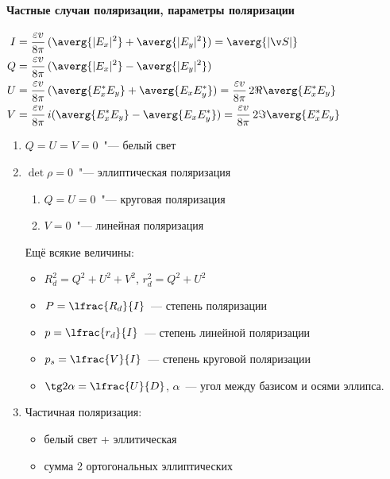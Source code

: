 \documentclass{trchesh}
\begin{document}
\begin{multicols*}{3}
\paragraph{Частные случаи поляризации, параметры поляризации}
$
\begin{aligned}
  I &= \frac{\varepsilon v}{8 \pi} \, (\averg{|E_x|^2} +  \averg{|E_y|^2}) = \averg{|\v S|} \\
  Q &= \frac{\varepsilon v}{8 \pi} \, (\averg{|E_x|^2} -  \averg{|E_y|^2}) \\
  U &= \frac{\varepsilon v}{8 \pi} \, (\averg{E_x^* E_y} +  \averg{E_xE_y^*}) 
  = \frac{\varepsilon v}{8 \pi} \, 2 \Re \averg{E_x^* E_y} \\
  V &= \frac{\varepsilon v}{8 \pi} \,i (\averg{E_x^* E_y} -  \averg{E_xE_y^*}) 
  = \frac{\varepsilon v}{8 \pi} \, 2 \Im \averg{E_x^* E_y} \\
\end{aligned}
$
\begin{enumerate}
  \item $Q=U=V=0$~"--- белый свет
  \item $\det \rho = 0$~"--- эллиптическая поляризация
\begin{enumerate}
  \item $Q=U=0$~"--- круговая поляризация
  \item $V=0$~"--- линейная поляризация
\end{enumerate}

Ещё всякие величины:
\begin{itemize}
  \item $R_d^2 = Q^2 + U^2 + V^2$, $r_d^2 = Q^2 + U^2$
  \item $P = \lfrac{R_d}{I}$~--- степень поляризации
  \item $p = \lfrac{r_d}{I}$~--- степень линейной поляризации
  \item $p_s = \lfrac{V}{I}$~--- степень круговой поляризации
  \item $\tg 2 \alpha = \lfrac{U}{D}$, $\alpha$~--- угол между базисом и осями эллипса.
\end{itemize}

\item Частичная поляризация:  
\begin{itemize}
  \item белый свет + эллитическая
  \item сумма 2 ортогональных эллиптических
\end{itemize}
\end{enumerate}

\end{multicols*}
\end{document}
